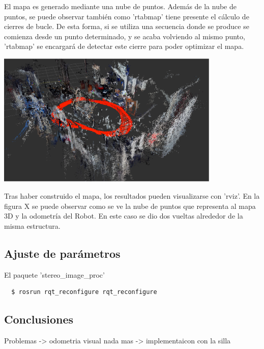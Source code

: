 El mapa es generado mediante una nube de puntos. Además de la nube de puntos, se
puede observar también como 'rtabmap' tiene presente el cálculo de cierres de
bucle. De esta forma, si se utiliza una secuencia donde se produce se comienza
desde un punto determinado, y se acaba volviendo al mismo punto, 'rtabmap' se
encargará de detectar este cierre para poder optimizar el mapa.

\begin{minipage}{\linewidth}
    \centering
    \includegraphics[width=0.8\textwidth]{images/cap4/rviz.eps}
    \label{fig:Ros-Diagram}
\end{minipage}

Tras haber construido el mapa, los resultados pueden visualizarse con 'rviz'. En
la figura X se puede observar como se ve la nube de puntos que representa al
mapa 3D y la odometría del Robot. En este caso se dio dos vueltas alrededor de
la misma estructura.

\subsection{Ajuste de parámetros}

El paquete 'stereo\_image\_proc'
\\
\begin{lstlisting}
  $ rosrun rqt_reconfigure rqt_reconfigure
\end{lstlisting}


\subsection{Conclusiones}

Problemas -> odometria visual nada mas -> implementaicon con la silla


